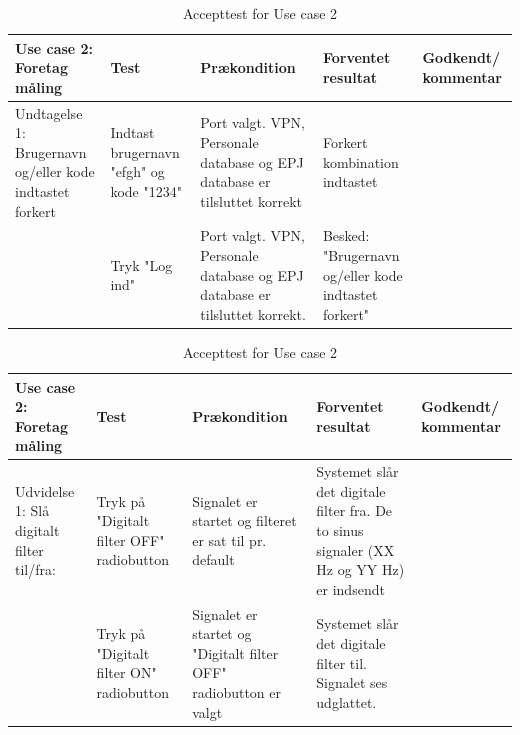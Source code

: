 \begin{table}[H]
\caption{Accepttest for Use case 2}\label{tab:tabel10}
\begin{tabular}{|>{\raggedright\arraybackslash}p{2.5cm}| >{\raggedright\arraybackslash}p{2.9cm} | >{\raggedright\arraybackslash}p{2.9cm} | >{\raggedright\arraybackslash}p{2.9cm} | >{\raggedright\arraybackslash}p{2.8cm} |}
   \hline
   \textbf{Use case 2: Foretag måling} &\textbf{Test}& \textbf{Prækondition} & \textbf{Forventet resultat} & \textbf{Godkendt/ kommentar}\\ \hline
   Undtagelse 1: Brugernavn og/eller kode indtastet forkert & Indtast brugernavn "efgh" og kode "1234"& Port valgt. VPN, Personale database og EPJ database er tilsluttet korrekt & Forkert kombination indtastet &  \\\hline
   &Tryk "Log ind" & Port valgt. VPN, Personale database og EPJ database er tilsluttet korrekt. & Besked: "Brugernavn og/eller kode indtastet forkert" &\\\hline
\end{tabular}
\end{table}

\begin{table}[H]
\caption{Accepttest for Use case 2}\label{tab:tabel11}
\begin{tabular}{|>{\raggedright\arraybackslash}p{2.5cm}| >{\raggedright\arraybackslash}p{2.9cm} | >{\raggedright\arraybackslash}p{2.9cm} | >{\raggedright\arraybackslash}p{2.9cm} | >{\raggedright\arraybackslash}p{2.8cm} |}
   \hline
   \textbf{Use case 2: Foretag måling} &\textbf{Test}& \textbf{Prækondition} & \textbf{Forventet resultat} & \textbf{Godkendt/ kommentar}\\ \hline
   Udvidelse 1: Slå digitalt filter til/fra:& Tryk på "Digitalt filter OFF" radiobutton & Signalet er startet og filteret er sat til pr. default & Systemet slår det digitale filter fra. De to sinus signaler (XX Hz og YY Hz) er indsendt &\\\hline
   &Tryk på "Digitalt filter ON" radiobutton & Signalet er startet og "Digitalt filter OFF" radiobutton er valgt & Systemet slår det digitale filter til. Signalet ses udglattet. &\\\hline
\end{tabular}
\end{table}

